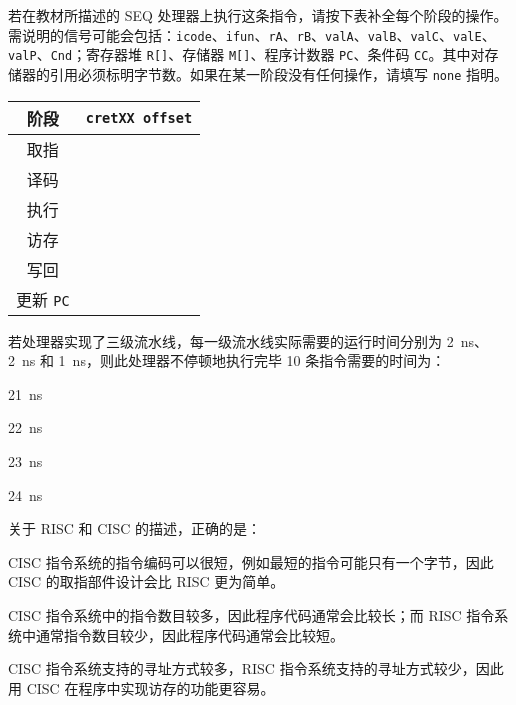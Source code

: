 \begin{problems}
        若在教材所描述的 SEQ 处理器上执行这条指令，请按下表补全每个阶段的操作。需说明的信号可能会包括：\verb|icode|、\verb|ifun|、\verb|rA|、\verb|rB|、\verb|valA|、\verb|valB|、\verb|valC|、\verb|valE|、\verb|valP|、\verb|Cnd|；寄存器堆 \verb|R[]|、存储器 \verb|M[]|、程序计数器 \verb|PC|、条件码 \verb|CC|。其中对存储器的引用必须标明字节数。如果在某一阶段没有任何操作，请填写 \texttt{none} 指明。
        \begin{table}[H]
            \centering
            \begin{tabular}{|c|c|}
                \hline
                阶段 & {\qquad \qquad \qquad \qquad} \verb|cretXX offset| {\qquad \qquad \qquad \qquad} \\ \hline
                取指 & \rule{0pt}{10ex} \\ \hline
                译码 & \rule{0pt}{10ex} \\ \hline
                执行 & \rule{0pt}{10ex} \\ \hline
                访存 & \rule{0pt}{10ex} \\ \hline
                写回 & \rule{0pt}{10ex} \\ \hline
                更新 \verb|PC| & \rule{0pt}{10ex} \\ \hline
            \end{tabular}
        \end{table}
         若处理器实现了三级流水线，每一级流水线实际需要的运行时间分别为 \SI{2}{ns}、\SI{2}{ns} 和 \SI{1}{ns}，则此处理器不停顿地执行完毕 10 条指令需要的时间为：
        \begin{choices}
            \item \SI{21}{ns}
            \item \SI{22}{ns}
            \item \SI{23}{ns}
            \item \SI{24}{ns}
        \end{choices}
         关于 RISC 和 CISC 的描述，正确的是：
        \begin{choices}
            \item CISC 指令系统的指令编码可以很短，例如最短的指令可能只有一个字节，因此 CISC 的取指部件设计会比 RISC 更为简单。
            \item CISC 指令系统中的指令数目较多，因此程序代码通常会比较长；而 RISC 指令系统中通常指令数目较少，因此程序代码通常会比较短。
            \item CISC 指令系统支持的寻址方式较多，RISC 指令系统支持的寻址方式较少，因此用 CISC 在程序中实现访存的功能更容易。

\end{choices}
\end{problems}
